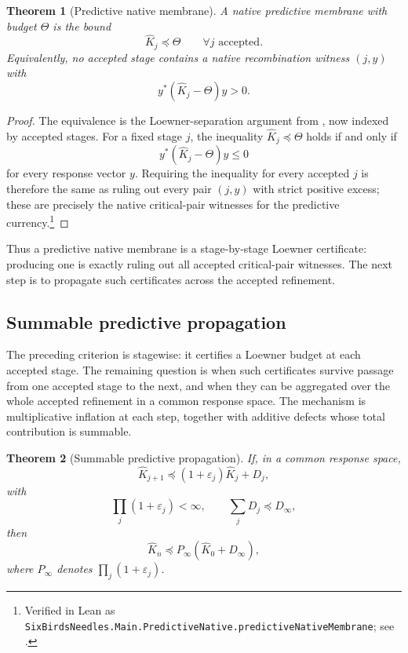 \documentclass[11pt]{article}
\newcommand{\preceqq}{\preceq}
\newtheorem{theorem}{Theorem}[section]
\theoremstyle{definition}
\begin{document}
\begin{theorem}[Predictive native membrane]\label{thm:main:predictive-native-membrane}
A native predictive membrane with budget \(\Theta\) is the bound
\[
  \widehat K_j\preceqq\Theta\qquad\forall j\text{ accepted}.
\]
Equivalently, no accepted stage contains a native recombination witness
\((j,y)\) with
\[
  y^*(\widehat K_j-\Theta)y>0.
\]
\end{theorem}

\begin{proof}
The equivalence is the Loewner-separation argument from
, now indexed by accepted stages.  For a fixed
stage \(j\), the inequality \(\widehat K_j\preceqq\Theta\) holds if and
only if
\[
  y^*(\widehat K_j-\Theta)y\le 0
\]
for every response vector \(y\).  Requiring the inequality for every
accepted \(j\) is therefore the same as ruling out every pair \((j,y)\)
with strict positive excess; these are precisely the native critical-pair
witnesses for the predictive currency.\footnote{Verified in Lean as
\texttt{SixBirdsNeedles.Main.PredictiveNative.predictiveNativeMembrane};
see .}
\end{proof}

Thus a predictive native membrane is a stage-by-stage Loewner
certificate: producing one is exactly ruling out all accepted
critical-pair witnesses.  The next step is to propagate such certificates
across the accepted refinement.

\subsection{Summable predictive propagation}

The preceding criterion is stagewise: it certifies a Loewner budget at
each accepted stage.  The remaining question is when such certificates
survive passage from one accepted stage to the next, and when they can
be aggregated over the whole accepted refinement in a common response
space.  The mechanism is multiplicative inflation at each step, together
with additive defects whose total contribution is summable.

\begin{theorem}[Summable predictive propagation]\label{thm:main:summable-predictive-propagation}
If, in a common response space,
\[
  \widehat K_{j+1}\preceqq (1+\varepsilon_j)\widehat K_j+D_j,
\]
with
\[
  \prod_j(1+\varepsilon_j)<\infty,\qquad \sum_jD_j\preceqq D_\infty,
\]
then
\[
  \widehat K_n\preceqq P_\infty(\widehat K_0+D_\infty),
\]
where \(P_\infty\) denotes \(\prod_j(1+\varepsilon_j)\).
\end{theorem}
\end{document}
